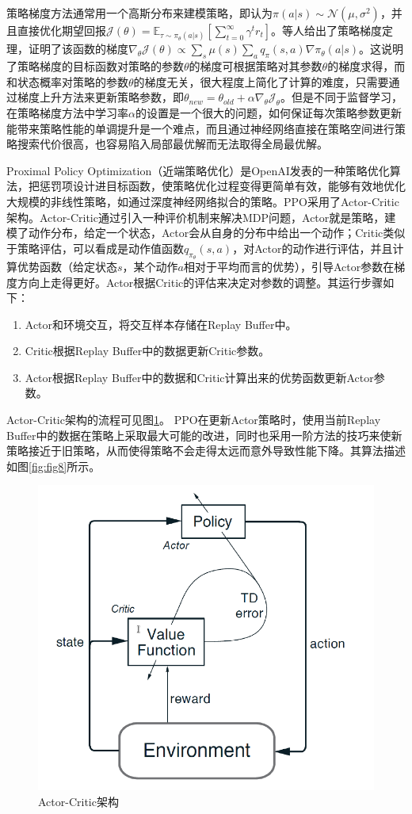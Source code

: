 \documentclass[lang=cn,11pt,a4paper,cite=number]{elegantpaper}
\begin{document}
策略梯度方法通常用一个高斯分布来建模策略，即认为$\pi(a|s)\sim\mathcal{N}(\mu,\sigma^2)$，并且直接优化期望回报$\mathcal{J}(\theta)=\mathbb{E}_{\tau\sim\pi_\theta(a|s)}[\sum_{t=0}^{\infty}\gamma^tr_t]$。等人给出了策略梯度定理，证明了该函数的梯度$\nabla_\theta\mathcal{J}(\theta)\propto\sum_s\mu(s)\sum_a q_\pi(s,a)\nabla\pi_\theta(a|s)$。这说明了策略梯度的目标函数对策略的参数$\theta$的梯度可根据策略对其参数$\theta$的梯度求得，而和状态概率对策略的参数$\theta$的梯度无关，很大程度上简化了计算的难度，只需要通过梯度上升方法来更新策略参数，即$\theta_{new}=\theta_{old}+\alpha\nabla_\theta\mathcal{J}_\theta$。但是不同于监督学习，在策略梯度方法中学习率$\alpha$的设置是一个很大的问题，如何保证每次策略参数更新能带来策略性能的单调提升是一个难点，而且通过神经网络直接在策略空间进行策略搜索代价很高，也容易陷入局部最优解而无法取得全局最优解。

Proximal Policy Optimization（近端策略优化）是OpenAI发表的一种策略优化算法\cite{schulman2017proximal}，把惩罚项设计进目标函数，使策略优化过程变得更简单有效，能够有效地优化大规模的非线性策略，如通过深度神经网络拟合的策略。PPO采用了Actor-Critic架构。Actor-Critic通过引入一种评价机制来解决MDP问题，Actor就是策略，建模了动作分布，给定一个状态，Actor会从自身的分布中给出一个动作；Critic类似于策略评估，可以看成是动作值函数$q_{\pi_\theta}(s,a)$，对Actor的动作进行评估，并且计算优势函数（给定状态$s$，某个动作$a$相对于平均而言的优势），引导Actor参数在梯度方向上走得更好。Actor根据Critic的评估来决定对参数的调整。其运行步骤如下：
\begin{enumerate}
	\item Actor和环境交互，将交互样本存储在Replay Buffer中。
	\item Critic根据Replay Buffer中的数据更新Critic参数。
	\item Actor根据Replay Buffer中的数据和Critic计算出来的优势函数更新Actor参数。
\end{enumerate}
Actor-Critic架构的流程可见图\ref{fig:fig9}。
PPO在更新Actor策略时，使用当前Replay Buffer中的数据在策略上采取最大可能的改进，同时也采用一阶方法的技巧来使新策略接近于旧策略，从而使得策略不会走得太远而意外导致性能下降。其算法描述如图\ref{fig:fig8}所示。
\begin{figure}
	\centering
	\includegraphics[width=0.6\linewidth]{figure/fig9}
	\caption{Actor-Critic架构}
	\label{fig:fig9}
\end{figure}
\end{document}
